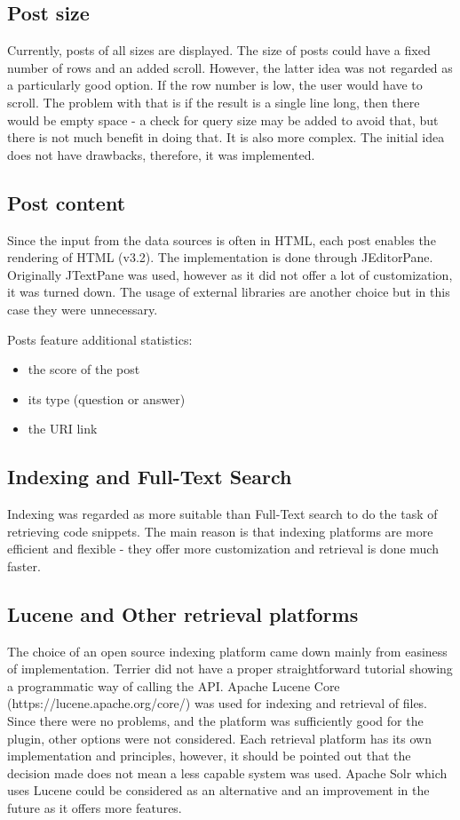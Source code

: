 \documentclass{l4proj}
\begin{document}
\subsection{Post size}
Currently, posts of all sizes are displayed. The size of posts could have a fixed number of rows and an added scroll. However, the latter idea was not regarded as a particularly good option. If the row number is low, the user would have to scroll. The problem with that is if the result is a single line long, then there would be empty space - a check for query size may be added to avoid that, but there is not much benefit in doing that. It is also more complex. The initial idea does not have drawbacks, therefore, it was implemented.

\subsection{Post content}
Since the input from the data sources is often in HTML, each post enables the rendering of HTML (v3.2). The implementation is done through JEditorPane. Originally JTextPane was used, however as it did not offer a lot of customization, it was  turned down. The usage of external libraries are another choice but in this case they were unnecessary.

Posts feature additional statistics:
\begin{itemize}
\item the score of the post
\item its type (question or answer)
\item the URI link
\end{itemize}

\subsection{Indexing and Full-Text Search}
Indexing was regarded as more suitable than Full-Text search to do the task of retrieving code snippets. The main reason is that indexing platforms are more efficient and flexible - they offer more customization and retrieval is done much faster.

\subsection{Lucene and Other retrieval platforms}
The choice of an open source indexing platform came down mainly from easiness of implementation. Terrier did not have a proper straightforward tutorial showing a programmatic way of calling the API. Apache Lucene Core (https://lucene.apache.org/core/) was used for indexing and retrieval of files. Since there were no problems, and the platform was sufficiently good for the plugin, other options were not considered. Each retrieval platform has its own implementation and principles, however, it should be pointed out that the decision made does not mean a less capable system was used. Apache Solr which uses Lucene could be considered as an alternative and an improvement in the future as it offers more features.
\end{document}
